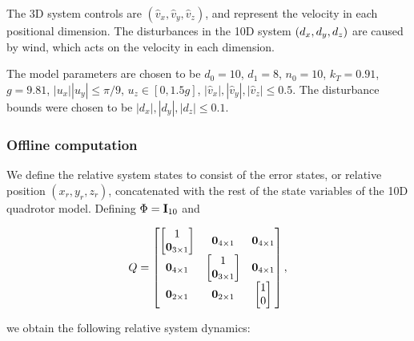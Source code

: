 The 3D system controls are $(\hat v_x, \hat v_y, \hat v_z)$, and represent the velocity in each positional dimension. 
The disturbances in the 10D system $(d_x, d_y, d_z)$ are caused by wind, which acts on the velocity in each dimension. 

The model parameters are chosen to be $d_0=10$, $d_1=8$, $n_0=10$, $k_T=0.91$, $g=9.81$, $|u_x| |u_y| \le \pi/9$, $u_z \in [0, 1.5g]$, $|\hat v_x|, |\hat v_y|, |\hat v_z| \le 0.5$.
The disturbance bounds were chosen to be $|d_x|, |d_y|, |d_z| \le 0.1$.

\subsubsection{Offline computation}
We define the relative system states to consist of the error states, or relative position $(x_r, y_r, z_r)$, concatenated with the rest of the state variables of the 10D quadrotor model.
Defining $\Phi = \mathbf I_{10}$ and 

\begin{equation*}
Q = 
\begin{bmatrix}
  \begin{bmatrix} 1 \\ \mathbf 0_{3 \times 1} \end{bmatrix} 
    & \mathbf 0_{4\times 1} 
    & \mathbf 0_{4\times 1} \\
  \mathbf 0_{4\times 1} 
    & \begin{bmatrix} 1 \\ \mathbf 0_{3 \times 1} \end{bmatrix} 
    &  \mathbf 0_{4\times 1} \\
  \mathbf 0_{2\times 1} 
    & \mathbf 0_{2\times 1} 
    & \begin{bmatrix} 1 \\ 0 \end{bmatrix}
\end{bmatrix},
\end{equation*}

\noindent we obtain the following relative system dynamics:

